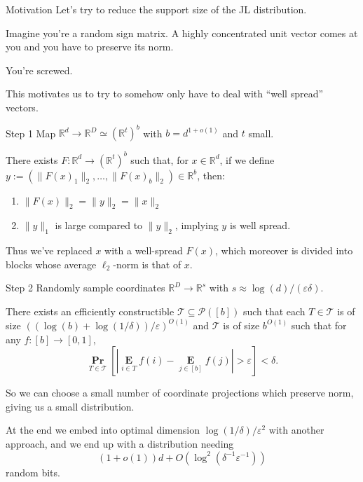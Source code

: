 \documentclass[10pt]{beamer}
\newcommand{\R}{\mathbb{R}}
\renewcommand{\P}{\operatorname*{\mathbf{Pr}}}
\newcommand{\E}{\operatorname*{\mathbf{E}}}
\newcommand{\eps}{\varepsilon}
\begin{document}
\begin{frame}
  \sectionpage
\end{frame}

\begin{frame}{Motivation}
  Let's try to reduce the support size of the JL distribution.

  \pause\bigskip\bigskip

  Imagine you're a random sign matrix. A highly concentrated unit
  vector comes at you and you have to preserve its norm.

  \pause\bigskip

  You're screwed.

  \pause\bigskip\bigskip

  This motivates us to try to somehow only have to deal with ``well
  spread'' vectors.
\end{frame}

\begin{frame}{Step 1}
  Map $\R^d \to \R^D \simeq (\R^t)^b$ with $b = d^{1+o(1)}$ and $t$
  small.

  \begin{theorem}[informal]
    There exists $F : \R^d \to (\R^t)^b$ such that, for $x \in \R^d$,
    if we define $y := (\|F(x)_1\|_2,\ldots,\|F(x)_b\|_2) \in \R^b$,
    then:
    \begin{enumerate}
    \item $\|F(x)\|_2 = \|y\|_2 = \|x\|_2$
    \item $\|y\|_1$ is large compared to $\|y\|_2$, implying $y$ is
      well spread.
    \end{enumerate}
  \end{theorem}

  \pause\bigskip\bigskip
  Thus we've replaced $x$ with a well-spread $F(x)$, which moreover is
  divided into blocks whose average $\ell_2$-norm is that of $x$.
\end{frame}

\begin{frame}{Step 2}
  Randomly sample coordinates $\R^D \to \R^s$ with $s \approx
  \log(d)/(\eps \delta)$.

  \begin{theorem}
    There exists an efficiently constructible $\mathcal{T} \subseteq
    \mathcal{P}([b])$ such that each $T \in \mathcal{T}$ is of size
    $((\log(b)+\log(1/\delta))/\eps)^{O(1)}$ and $\mathcal{T}$ is
    of size $b^{O(1)}$ such that for any $f : [b] \to [0,1]$,
    \[
    \P_{T \in \mathcal{T}} [ |\E_{i \in T}f(i) - \E_{j \in
        [b]}f(j)| > \eps ] < \delta.
    \]
  \end{theorem}

  \pause\bigskip
  So we can choose a small number of coordinate projections which
  preserve norm, giving us a small distribution.

  \pause\bigskip
  At the end we embed into optimal dimension
  $\log(1/\delta)/\eps^2$ with another approach, and we end up
  with a distribution needing
  \[
  (1+o(1))d + O(\log^2(\delta^{-1}\eps^{-1}))
  \]
  random bits.
\end{frame}
\end{document}
